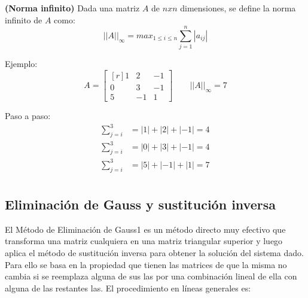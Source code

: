 \documentclass[../main.tex]{subfiles}
\begin{document}
    \begin{definition}\textbf{(Norma infinito)} 
        Dada una matriz $A$ de $nxn$ dimensiones, se define la norma infinito de $A$ como:
        \begin{equation}
            ||A||_{\infty} = max_{1\leq i \leq n} \sum_{j=1}^{n} |a_{ij}|
        \end{equation}

        Ejemplo:
        \begin{equation}
            A = \begin{bmatrix*}[r]
                1 & 2 & -1 \\
                0 & 3 & -1 \\
                5 & -1 & 1
            \end{bmatrix*}
            \quad \quad
            ||A||_{\infty} = 7
        \end{equation}
        
        Paso a paso:
        \begin{equation}
            \begin{split}
                \sum_{j = i}^{3} &= |1| + |2| + |-1| = 4 \\
                \sum_{j = i}^{3} &= |0| + |3| + |-1| = 4 \\
                \sum_{j = i}^{3} &= |5| + |-1| + |1| = 7 \\
            \end{split}
        \end{equation}

    \end{definition}

    \subsection{Eliminación de Gauss y sustitución inversa}
        El Método de Eliminación de Gauss1 es un método directo muy efectivo que transforma una matriz cualquiera en una matriz triangular superior y luego aplica el método de sustitución inversa para obtener la solución del sistema dado. Para ello se basa en la propiedad que tienen las matrices de que la misma no cambia si se reemplaza alguna de sus las por una combinación lineal de ella con alguna de las restantes las. El procedimiento en líneas generales es:\\
\end{document}

